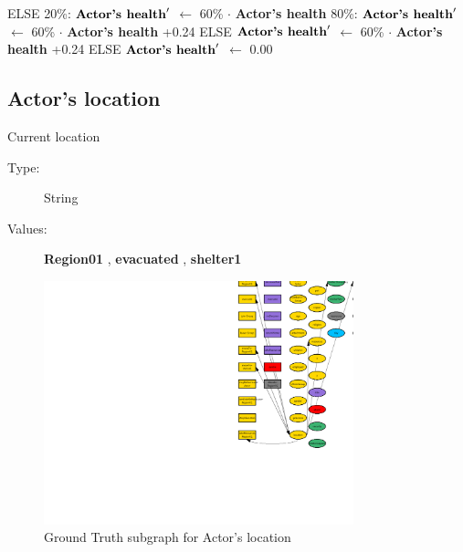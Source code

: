 \documentclass{article}%
\begin{document}
\begin{flushleft}
\linebreak%
\hspace*{6em}%
ELSE %
\linebreak%
\hspace*{8em}%
20\%: %
$\mbox{\textbf{Actor's health}} '$%
$\leftarrow$%
60\%%
$\cdot$%
\textbf{Actor's health}%
\linebreak%
\hspace*{8em}%
80\%: %
$\mbox{\textbf{Actor's health}} '$%
$\leftarrow$%
60\%%
$\cdot$%
\textbf{Actor's health}%
+0.24%
\linebreak%
\hspace*{4em}%
ELSE %
$\mbox{\textbf{Actor's health}} '$%
$\leftarrow$%
60\%%
$\cdot$%
\textbf{Actor's health}%
+0.24%
\linebreak%
\hspace*{2em}%
ELSE %
$\mbox{\textbf{Actor's health}} '$%
$\leftarrow$%
0.00%
\end{flushleft}

%
\subsection{Actor's location}%
\label{subsec:Actor's location}%
Current location%
\begin{description}%
\item[Type:]%
String%
\item[Values:]%
\textbf{Region01}%
, %
\textbf{evacuated}%
, %
\textbf{shelter1}%
\end{description}%


\begin{figure}[ht]%
\centering%
\includegraphics[width=0.8\textwidth]{images/locationOfActor.png}%
\caption{Ground Truth subgraph for Actor's location}%
\end{figure}
\end{document}

